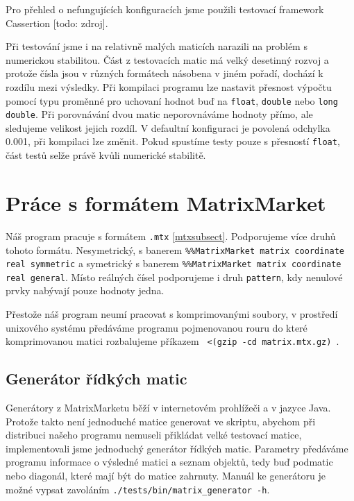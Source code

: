 Pro přehled o nefungujících konfiguracích jsme použili testovací framework Cassertion [todo: zdroj].

Při testování jsme i na relativně malých maticích narazili na problém s numerickou stabilitou. Část z testovacích matic má velký desetinný rozvoj a protože čísla jsou v různých formátech násobena v jiném pořadí, dochází k rozdílu mezi výsledky. Při kompilaci programu lze nastavit přesnost výpočtu pomocí typu proměnné pro uchovaní hodnot buď na \texttt{float}, \texttt{double} nebo \texttt{long double}. Při porovnávání dvou matic neporovnáváme hodnoty přímo, ale sledujeme velikost jejich rozdíl. V defaultní konfiguraci je povolená odchylka 0.001, při kompilaci lze změnit. Pokud spustíme testy  pouze s přesností \texttt{float}, část testů selže právě kvůli numerické stabilitě. 


\section{Práce s formátem MatrixMarket}
\label{MM}

Náš program pracuje s formátem \texttt{.mtx} \ref{mtxsubsect}. Podporujeme více druhů tohoto formátu. Nesymetrický, s banerem \texttt{\%\%MatrixMarket matrix coordinate real symmetric} a symetrický s banerem \texttt{\%\%MatrixMarket matrix coordinate real general}. Místo reálných čísel podporujeme i druh \texttt{pattern}, kdy nenulové prvky nabývají pouze hodnoty jedna.

Přestože náš program neumí pracovat s komprimovanými soubory, v prostředí unixového systému předáváme programu pojmenovanou rouru do které komprimovanou matici rozbalujeme příkazem \texttt{ <(gzip -cd matrix.mtx.gz) }.

\subsection{Generátor řídkých matic}

Generátory z MatrixMarketu běží v internetovém prohlížeči a v jazyce Java. Protože takto není jednoduché matice generovat ve skriptu, abychom při distribuci našeho programu nemuseli přikládat velké testovací matice, implementovali jsme jednoduchý generátor řídkých matic. Parametry předáváme programu informace o výsledné matici a seznam objektů, tedy buď podmatic nebo diagonál, které mají být do matice zahrnuty. Manuál ke generátoru je možné vypsat zavoláním \texttt{./tests/bin/matrix\_generator -h}.    

